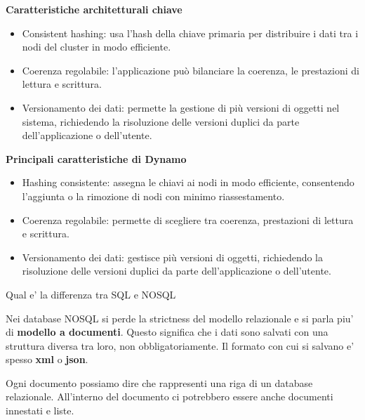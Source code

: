 \textbf{Caratteristiche architetturali chiave}
\begin{itemize}
    \item Consistent hashing: usa l'hash della chiave primaria per distribuire i dati tra
          i nodi del cluster in modo efficiente.
    \item Coerenza regolabile: l'applicazione può bilanciare la coerenza, le prestazioni
          di lettura e scrittura.
    \item Versionamento dei dati: permette la gestione di più versioni di oggetti nel
          sistema, richiedendo la risoluzione delle versioni duplici da parte
          dell'applicazione o dell'utente.
\end{itemize}

\textbf{Principali caratteristiche di Dynamo}
\begin{itemize}
    \item Hashing consistente: assegna le chiavi ai nodi in modo efficiente, consentendo
          l'aggiunta o la rimozione di nodi con minimo riassestamento.
    \item Coerenza regolabile: permette di scegliere tra coerenza, prestazioni di lettura
          e scrittura.
    \item Versionamento dei dati: gestisce più versioni di oggetti, richiedendo la
          risoluzione delle versioni duplici da parte dell'applicazione o dell'utente.
\end{itemize}

\begin{domanda}
    Qual e' la differenza tra SQL e NOSQL
\end{domanda}

Nei database NOSQL si perde la strictness del modello relazionale e si parla piu' 
di \textbf{modello a documenti}. Questo significa che i dati sono salvati con una
struttura diversa tra loro, non obbligatoriamente. Il formato con cui si 
salvano e' spesso \textbf{xml} o \textbf{json}.

Ogni documento possiamo dire che rappresenti una riga di un database relazionale. All'interno
del documento ci potrebbero essere anche documenti innestati e liste.

\newpage